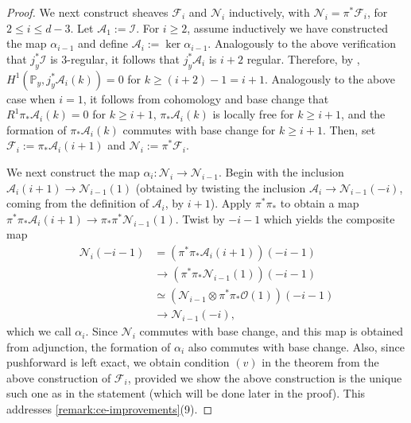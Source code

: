 \documentclass[12 pt]{amsart}
\newcommand{\rboxed}[1]{#1}
\theoremstyle{plain}
\theoremstyle{definition}
\theoremstyle{remark}
\numberwithin{equation}{section}
\newcommand\bp{\mathbb P}
\newcommand\sca{\mathscr A}
\newcommand\scf{\mathscr F}
\newcommand\sci{\mathscr I}
\newcommand\scn{\mathscr N}
\newcommand\sco{\mathscr O}
\newcommand \ra{\rightarrow}
\begin{document}
\begin{proof}
	We next construct sheaves $\scf_i$ and $\scn_i$ inductively, with
	$\scn_i = \pi^* \scf_i$, for $2 \leq i \leq d-3$.  Let $\rboxed{\sca_1}
	:= \sci$.  For $i \geq 2$, 
	assume inductively we have constructed the map $\alpha_{i-1}$ and	
	define $\rboxed{\sca_i} := \ker \alpha_{i-1}$.
	Analogously to the above verification that $j_y^* \sci$ is $3$-regular,
	it follows that $j_y^* \sca_i$ is $i+2$ regular.  Therefore, by
	\cite[Lem.\ 5.1(b)]{FantechiGIK:fundamentalAlgebraicGeometry},
	$H^1(\bp_y, j_y^* \sca_i(k)) = 0$ for $k \geq (i + 2) - 1 = i+1$.
	Analogously to the above case when $i = 1$, it follows from cohomology
	and base change that $R^1 \pi_* \sca_i(k) = 0$ for $k \geq i+1$, $\pi_*
	\sca_i(k)$ is locally free for $k \geq i+1$, and the formation of $\pi_*
	\sca_i(k)$ commutes with base change for $ k \geq i+1$.  Then, set
	$\rboxed{\scf_i} := \pi_* \sca_i(i+1)$ and $\rboxed{\scn_i} := \pi^*
	\scf_i$.  
	
	We next construct the map $\alpha_i: \scn_i \ra \scn_{i-1}$.
	Begin with the inclusion $\sca_i(i+1) \ra \scn_{i-1}(1)$
	(obtained by twisting the inclusion $\sca_i \ra \scn_{i-1}(-i)$, coming
	from the definition of $\sca_i$, by $i+1$).  Apply $\pi^* \pi_*$ to
	obtain a map $\pi^* \pi_* \sca_i(i+1) \ra \pi_* \pi^* \scn_{i-1}(1)$.
	Twist by $-i-1$ which yields the composite map \begin{equation}
		\begin{aligned} \label{equation:adjunction-map} \scn_i(-i-1) &= \left(
			\pi^* \pi_* \sca_i(i+1) \right)(-i-1) \\ &\ra \left(
			\pi^* \pi_* \scn_{i-1}(1) \right)(-i-1) \\ &\simeq
			\left( \scn_{i-1} \otimes \pi^* \pi_* \sco(1) \right)
			(-i-1) \\ &\ra \scn_{i-1} (-i), \end{aligned}
		\end{equation} which we call $\rboxed{\alpha_i}$.  Since
		$\scn_i$ commutes with base change, and this map is obtained
		from adjunction, the formation of $\alpha_i$ also commutes with
		base change.  Also, since pushforward is left exact, we obtain
		condition $(v)$ in the theorem from the above construction of
		$\scf_i$, provided we show the above construction is the unique
		such one as in the statement (which will be done later in the
		proof). This addresses \autoref{remark:ce-improvements}(9).


\end{proof}
\end{document}
